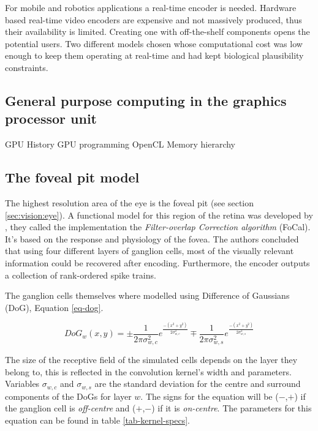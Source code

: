 For mobile and robotics applications a real-time encoder is needed. Hardware based real-time video encoders are expensive and not massively produced, thus their availability is limited. Creating one with off-the-shelf components opens the potential users. Two different models chosen whose computational cost was low enough to keep them operating at real-time and had kept biological plausibility constraints.


\subsection{General purpose computing in the graphics processor unit}

GPU History
GPU programming 
OpenCL
Memory hierarchy

\subsection{The foveal pit model}

The highest resolution area of the eye is the foveal pit (see section \ref{sec:vision:eye}). A functional model for this region of the retina was developed by \citeauthor{basab-model}, they called the implementation the \emph{Filter-overlap Correction algorithm} (FoCal)\cite{basab-model}. It's based on the response and physiology of the fovea. The authors concluded that using four different layers of ganglion cells, most of the visually relevant information could be recovered after encoding. Furthermore, the encoder outputs a collection of rank-ordered spike trains. 

The ganglion cells themselves where modelled using Difference of Gaussians (DoG), Equation \ref{eq-dog}. 

\begin{equation}
\label{eq-dog}
DoG_w(x,y) = \pm\frac{1}{2\pi\sigma_{w,c}^2}e^{\frac{-(x^2 + y^2)}{2\sigma_{w,c}^2}}
\mp\frac{1}{2\pi\sigma_{w,s}^2}e^{\frac{-(x^2 + y^2)}{2\sigma_{w,s}^2}}
\end{equation}

The size of the receptive field of the simulated cells depends on the layer they belong to, this is reflected in the convolution kernel's width and parameters. Variables $\sigma_{w,c}$ and $\sigma_{w,s}$ are the standard deviation for the centre and surround components of the DoGs for layer $w$.  The signs for the equation will be ($-$,$+$) if the ganglion cell is \emph{off-centre} and ($+$,$-$) if it is \emph{on-centre}. The parameters for this equation can be found in table \ref{tab-kernel-specs}.

